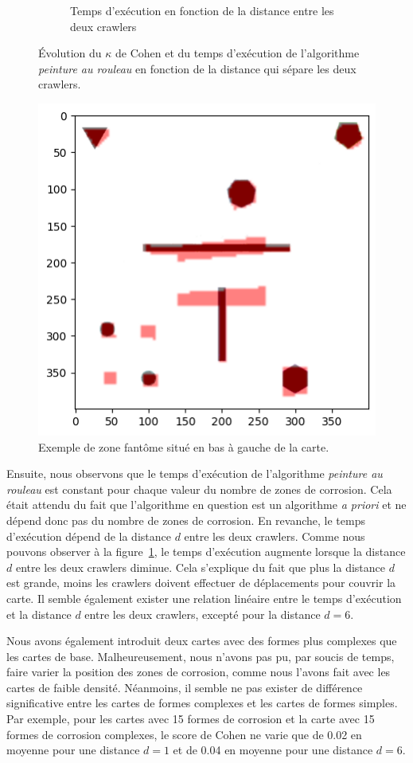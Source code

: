 \documentclass[francais,RandD]{rapportPFE}
\begin{document}
\begin{figure}[h!]
\begin{subfigure}[t]{0.49\linewidth}
						\caption{Temps d'exécution en fonction de la distance entre les deux crawlers}
						\label{fig:peinture_au_rouleau-time_vs_distance}
				\end{subfigure}
				\caption{Évolution du $\kappa$ de Cohen et du temps d'exécution de l'algorithme \textit{peinture au rouleau} en fonction de la distance qui sépare les deux crawlers.}
				\label{fig:peinture_au_rouleau-distance}
			\end{figure}

			\begin{figure}[h!]
				\centering
				\includegraphics[width=0.5\linewidth]{graphics/output.png}
				\caption{Exemple de zone fantôme situé en bas à gauche de la carte.}
				\label{fig:ghost_zone}
			\end{figure}

			Ensuite, nous observons que le temps d'exécution de l'algorithme \textit{peinture au rouleau} est constant pour chaque valeur du nombre de zones de corrosion.
			Cela était attendu du fait que l'algorithme en question est un algorithme \textit{a priori} et ne dépend donc pas du nombre de zones de corrosion.
			En revanche, le temps d'exécution dépend de la distance $d$ entre les deux crawlers.
			Comme nous pouvons observer à la figure~\ref{fig:peinture_au_rouleau-time_vs_distance}, le temps d'exécution augmente lorsque la distance $d$ entre les deux crawlers diminue.
			Cela s'explique du fait que plus la distance $d$ est grande, moins les crawlers doivent effectuer de déplacements pour couvrir la carte.
			Il semble également exister une relation linéaire entre le temps d'exécution et la distance $d$ entre les deux crawlers, excepté pour la distance $d = 6$.

			Nous avons également introduit deux cartes avec des formes plus complexes que les cartes de base.
			Malheureusement, nous n'avons pas pu, par soucis de temps, faire varier la position des zones de corrosion, comme nous l'avons fait avec les cartes de faible densité.
			Néanmoins, il semble ne pas exister de différence significative entre les cartes de formes complexes et les cartes de formes simples.
			Par exemple, pour les cartes avec 15 formes de corrosion et la carte avec 15 formes de corrosion complexes, le score de Cohen ne varie que de 0.02 en moyenne pour une distance $d = 1$ et de 0.04 en moyenne pour une distance $d = 6$.
\end{document}
